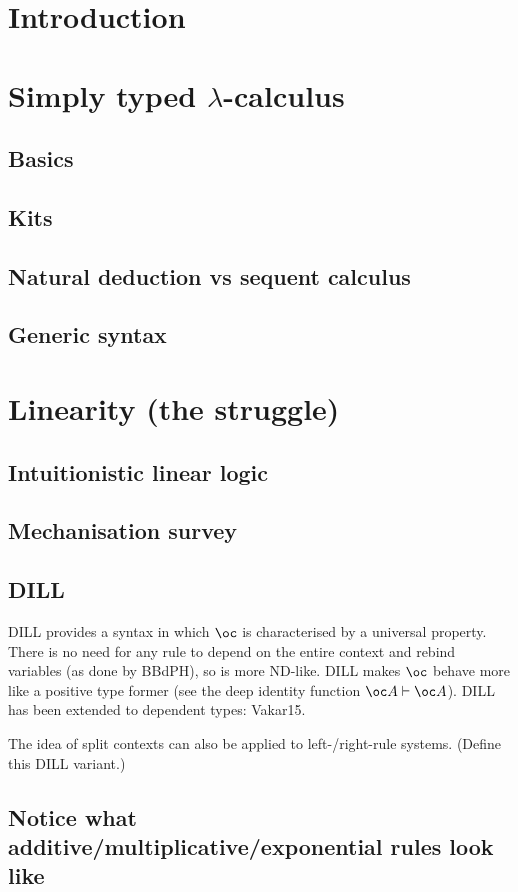 \documentclass[a4paper,oneside,11pt]{book}
\begin{document}
\chapter{Introduction}

\chapter{Simply typed $\lambda$-calculus}
  \section{Basics}
  \section{Kits}
  \section{Natural deduction vs sequent calculus}
  
  \section{Generic syntax}

\chapter{Linearity (the struggle)}
  \section{Intuitionistic linear logic}
  \section{Mechanisation survey}
  \section{DILL}
  DILL provides a syntax in which $\oc$ is characterised by a universal
  property.
  There is no need for any rule to depend on the entire context and rebind
  variables (as done by BBdPH), so is more ND-like.
  DILL makes $\oc$ behave more like a positive type former (see the deep
  identity function $\oc A \vdash \oc A$).
  DILL has been extended to dependent types: Vakar15.

  The idea of split contexts can also be applied to left-/right-rule systems.
  (Define this DILL variant.)

  \section{Notice what additive/multiplicative/exponential rules look like}
\end{document}
